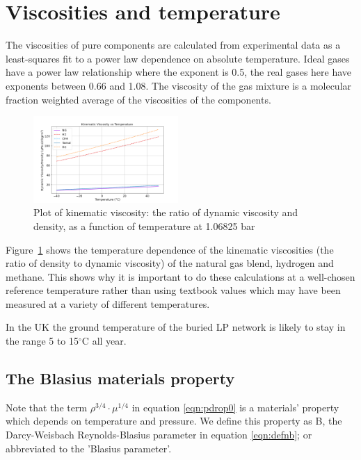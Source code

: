 \documentclass[5p]{elsarticle} %
\begin{document}
\section{Viscosities and temperature}
\label{sec:viscosities}
The viscosities of pure components are calculated from experimental data as a least-squares fit to a power law dependence on absolute temperature. Ideal gases have a power law relationship where the exponent is 0.5, the real gases here have exponents between 0.66 and 1.08. The viscosity of the gas mixture is a molecular fraction weighted average\citep{Krieger1951} of the viscosities of the components.

\begin{figure}[htb]
\centering
\includegraphics[width=0.49\textwidth]{peng_re.png}
\caption{Plot of kinematic viscosity: the ratio of dynamic viscosity and density, as a function of temperature at 1.06825 bar}
\label{fig:peng_re}
\end{figure}

Figure~\ref{fig:peng_re} shows the temperature dependence of the kinematic viscosities (the ratio of density to dynamic viscosity) of  the natural gas blend, hydrogen and methane. This shows why it is important to do these calculations at a well-chosen reference temperature rather than using textbook values which may have been measured at a variety of different temperatures.

In the UK the ground temperature of the buried LP network is likely to stay in the range 5 to 15$^\circ$C all year\citep{MacKay2008}.



\subsection{The Blasius materials property}
\label{sec:blasiusparam}
Note that the term $\rho^{3/4} \cdot \mu^{1/4}$ in equation \eqref{eqn:pdrop0} is a materials' property which depends on temperature and pressure. We define this property as B, the Darcy-Weisbach Reynolds-Blasius parameter in equation \eqref{eqn:defnb}; or abbreviated to the 'Blasius parameter'.
\end{document}
